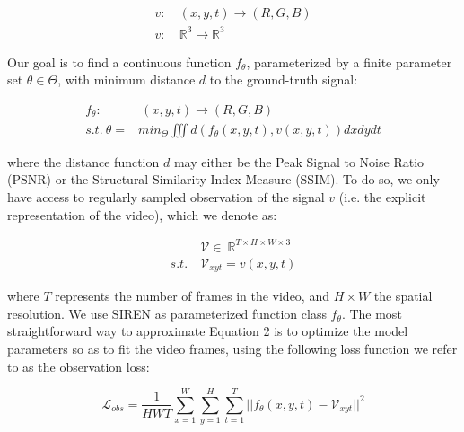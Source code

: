 \documentclass{article}
\begin{document}
\begin{equation}
\begin{aligned}
v:& \: (x, y, t) \rightarrow (R, G, B) \\
v:& \: \mathbb{R}^3 \rightarrow \mathbb{R}^3
\end{aligned}
\end{equation}

Our goal is to find a continuous function $f_{\theta}$, parameterized by a finite parameter set $\theta \in \Theta$,
with minimum distance $d$ to the ground-truth signal:

\begin{equation}
\begin{aligned}
f_{\theta}:& \:(x, y, t) \rightarrow (R, G, B) \\
s.t. \: \theta =& min_{\Theta} \iiint d(f_{\theta}(x,y,t), v(x,y,t)) dx dy dt
\end{aligned}
\end{equation}

where the distance function $d$ may either be the Peak Signal to Noise Ratio (PSNR) or the Structural Similarity Index Measure (SSIM).
To do so, we only have access to regularly sampled observation of the signal $v$
(i.e. the explicit representation of the video), which we denote as:

\begin{equation}
\begin{aligned}
&\mathcal{V} \in  \: \mathbb{R}^{T \times H \times W \times 3} \\
s.t. \: &\mathcal{V}_{xyt} =   v(x, y, t) %
\end{aligned}
\end{equation}

where $T$ represents the number of frames in the video, and $H \times W$ the spatial resolution.
We use SIREN as parameterized function class $f_{\theta}$.
The most straightforward way to approximate Equation 2 is to optimize the model parameters so as to fit the video frames,
using the following loss function we refer to as the observation loss:

\begin{equation}
\mathcal{L}_{obs} = \frac{1}{HWT} \sum_{x=1}^W\sum_{y=1}^H\sum_{t=1}^T || f_{\theta}(x,y,t) - \mathcal{V}_{xyt} ||^2
\end{equation}
\end{document}

